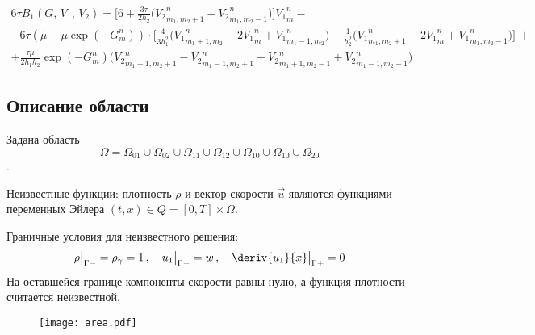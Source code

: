 \begin{multline*}
6\tau B_1 (G, \, V_1, \, V_2) =
\bigg[ 6 + \frac{3 \tau}{2 h_2} \bigg( {V_2}^{n}_{m_1, m_2 + 1} - {V_2}^{n}_{m_1, m_2 - 1} \bigg) \bigg] {V_1}^{n}_{m} 
- \\ -
6\tau (\widetilde{\mu} - \mu \exp(-G^n_m)) \cdot \bigg[ 
	\frac{4}{3 h_1^2} \bigg( {V_1}^n_{m_1 + 1, m_2} - 2 {V_1}^{n}_{m}  + {V_1}^n_{m_1 - 1, m_2} \bigg) +
	\frac{1}{  h_2^2} \bigg( {V_1}^n_{m_1, m_2 + 1} - 2 {V_1}^{n}_{m}  + {V_1}^n_{m_1, m_2 - 1} \bigg)  \bigg]
\, + \\ +
\frac{\tau \mu}{2 h_1 h_2} \exp(-G^n_m)
	\bigg( {V_2}^n_{m_1 + 1, m_2 + 1} - {V_2}^n_{m_1 - 1, m_2 + 1} - {V_2}^n_{m_1 + 1, m_2 - 1} + {V_2}^n_{m_1 - 1, m_2 - 1} \bigg)
\end{multline*}



\subsection{Описание области}
Задана область $$\Omega = \Omega_{01} \cup \Omega_{02} \cup \Omega_{11} \cup \Omega_{12} \cup \Omega_{10} \cup \Omega_{10} \cup \Omega_{20} $$.

Неизвестные функции: плотность $\rho$ и вектор скорости $\vec{u}$ являются функциями переменных Эйлера $(t, x) \in Q = [0, T] \times \Omega$.

Граничные условия для неизвестного решения: 
$$
	\rho \big|_{\Gamma-} = \rho_\gamma = 1  \,, \quad
	u_1 \big|_{\Gamma-} = w                 \,, \quad
	\deriv{u_1}{x} \big|_{\Gamma+} = 0
$$
На оставшейся границе компоненты скорости равны нулю, а функция плотности считается неизвестной.

\newpage
\begin{figure}[h!] \centering
	\texttt{[image: area.pdf]}
	\label{chop:diag}
\end{figure}
